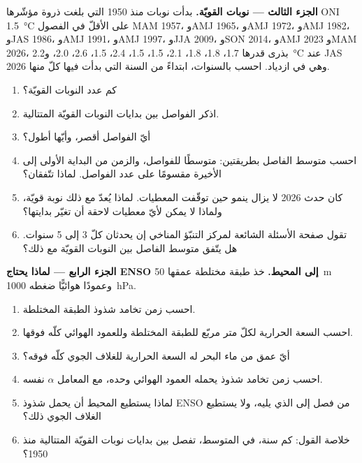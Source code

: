\begin{problem}
\medskip\noindent\textbf{الجزء الثالث --- نوبات  القويّة.}
بدأت نوبات  منذ 1950 التي بلغت ذروة مؤشّرها ONI \qty{1.5}{\celsius} على الأقلّ في
الفصول MAM 1957، وAMJ 1965، وAMJ 1972، وAMJ 1982، وJAS 1986، وAMJ 1991، وAMJ 1997، وJJA 2009، وSON 2014،
وAMJ 2023 وMAM 2026، بذرى قدرها 1.7، 1.8، 1.8، 2.1، 1.5، 1.5، 2.4، 1.5، 2.6، 2.0، و\qty{2.2}{\celsius}
عند JAS 2026 وهي في ازدياد. احسب بالسنوات، ابتداءً من السنة التي بدأت فيها كلّ منها.
\begin{enumerate}[resume]
  \item كم عدد النوبات القويّة؟
  \item اذكر الفواصل بين بدايات النوبات القويّة المتتالية.
  \item أيّ الفواصل أقصر، وأيّها أطول؟
  \item احسب متوسط الفاصل بطريقتين: متوسطًا للفواصل، والزمن
        من البداية الأولى إلى الأخيرة مقسومًا على عدد الفواصل. لماذا تتّفقان؟
  \item كان حدث 2026 لا يزال ينمو حين توقّفت المعطيات. لماذا يُعدّ مع ذلك
        نوبة قويّة، ولماذا لا يمكن لأيّ معطيات لاحقة أن تغيّر بدايتها؟
  \item تقول صفحة الأسئلة الشائعة لمركز التنبّؤ المناخي إن   يحدثان كلّ 3 إلى 5
        سنوات. هل يتّفق متوسط الفاصل بين النوبات القويّة مع ذلك؟
\end{enumerate}

\medskip\noindent\textbf{الجزء الرابع --- لماذا يحتاج ENSO إلى المحيط.}
خذ طبقة مختلطة عمقها \qty{50}{m} وعمودًا هوائيًّا ضغطه \qty{1000}{hPa}.
\begin{enumerate}[resume]
  \item احسب زمن تخامد شذوذ الطبقة المختلطة.
  \item احسب السعة الحرارية لكلّ متر مربّع للطبقة المختلطة وللعمود الهوائي كلّه
        فوقها.
  \item أيّ عمق من ماء البحر له السعة الحرارية للغلاف الجوي كلّه فوقه؟
  \item احسب زمن تخامد شذوذ يحمله العمود الهوائي وحده، مع المعامل
        $\alpha$ نفسه.
  \item لماذا يستطيع المحيط أن يحمل شذوذ ENSO من فصل إلى الذي يليه، ولا
        يستطيع الغلاف الجوي ذلك؟
  \item خلاصة القول: كم سنة، في المتوسط، تفصل بين بدايات نوبات  القويّة المتتالية
        منذ 1950؟
\end{enumerate}
\end{problem}
